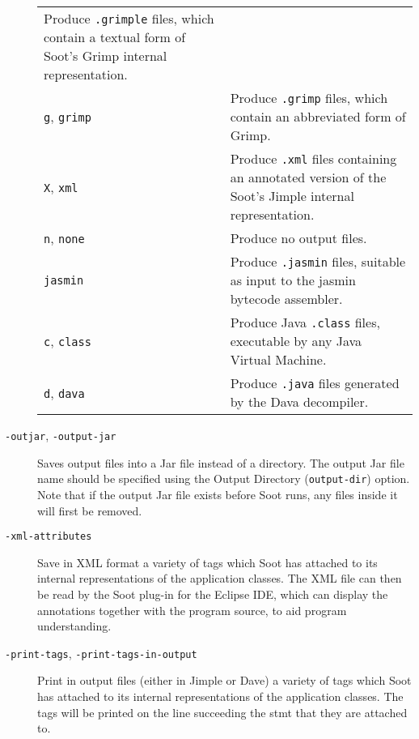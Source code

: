 \documentclass{article}
\begin{document}
\begin{description}
\begin{longtable}{p{1in}p{4in}}
Produce {\tt .grimple} files, which contain a textual
form of Soot's Grimp internal representation.
\\
{\tt g}, {\tt grimp} 
&

Produce {\tt .grimp} files, which contain an abbreviated form
of Grimp.
\\
{\tt X}, {\tt xml} 
&

Produce {\tt .xml} files containing an annotated
version of the Soot's Jimple internal representation.
\\
{\tt n}, {\tt none} 
&

Produce no output files.
\\
{\tt jasmin} 
&

Produce {\tt .jasmin} files, suitable as input to the jasmin
bytecode assembler.
\\
{\tt c}, {\tt class} 
&

Produce Java {\tt .class} files, executable by any Java
Virtual Machine.
\\
{\tt d}, {\tt dava} 
&

Produce {\tt .java} files generated by the Dava decompiler.
\\

\end{longtable}


  \item[
  {\tt -outjar}, 
  {\tt -output-jar}]

Saves output files into a Jar file instead of a directory. The output
Jar file name should be specified using the Output Directory
({\tt output-dir}) option. Note that if the output Jar file exists
before Soot runs, any files inside it will first be removed.



  \item[
  {\tt -xml-attributes}]

Save in XML format a variety of tags which Soot has attached to
its internal representations of the application classes. The XML
file can then be read by the Soot plug-in for the Eclipse IDE,
which can display the annotations together with the program
source, to aid program understanding.



  \item[
  {\tt -print-tags}, 
  {\tt -print-tags-in-output}]

Print in output files (either in Jimple or Dave) a variety of tags which
Soot has attached to
its internal representations of the application classes. The tags will
be printed on the line succeeding the stmt that they are attached to.




\end{description}
\end{document}
